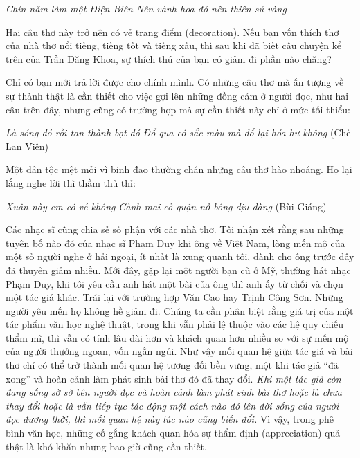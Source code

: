 \documentclass[../main.tex]{subfiles}
\begin{document}
\begin{multicols}{2}
\begin{blockquote}
\textit{Chín năm làm một Điện Biên} 
\textit{Nên vành hoa đỏ nên thiên sử vàng} 

\end{blockquote}


Hai câu thơ này trở nên có vẻ trang điểm (decoration). Nếu bạn vốn thích thơ của nhà thơ nổi tiếng, tiếng tốt và tiếng xấu, thì sau khi đã biết câu chuyện kể trên của Trần Đăng Khoa, sự thích thú của bạn có giảm đi phần nào chăng? 

Chỉ có bạn mới trả lời được cho chính mình. Có những câu thơ mà ấn tượng về sự thành thật là cần thiết cho việc gợi lên những đồng cảm ở người đọc, như hai câu trên đây, nhưng cũng có trường hợp mà sự cần thiết này chỉ ở mức tối thiểu: 
\begin{blockquote}


\textit{Là sóng đó rồi tan thành bọt đó} 
\textit{Đổ qua có sắc màu mà đổ lại hóa hư không} 
(Chế Lan Viên) 

\end{blockquote}


Một dân tộc mệt mỏi vì binh đao thường chán những câu thơ hào nhoáng. Họ lại lắng nghe lời thì thầm thủ thỉ: 
\begin{blockquote}


\textit{Xuân này em có về không} 
\textit{Cành mai cố quận nở bông dịu dàng} 
(Bùi Giáng) 

\end{blockquote}


Các nhạc sĩ cũng chia sẻ số phận với các nhà thơ. Tôi nhận xét rằng sau những tuyên bố nào đó của nhạc sĩ Phạm Duy khi ông về Việt Nam, lòng mến mộ của một số người nghe ở hải ngoại, ít nhất là xung quanh tôi, dành cho ông trước đây đã thuyên giảm nhiều. Mới đây, gặp lại một người bạn cũ ở Mỹ, thường hát nhạc Phạm Duy, khi tôi yêu cầu anh hát một bài của ông thì anh ấy từ chối và chọn một tác giả khác. Trái lại với trường hợp Văn Cao hay Trịnh Công Sơn. Những người yêu mến họ không hề giảm đi. Chúng ta cần phân biệt rằng giá trị của một tác phẩm văn học nghệ thuật, trong khi vẫn phải lệ thuộc vào các hệ quy chiếu thẩm mĩ, thì vẫn có tính lâu dài hơn và khách quan hơn nhiều so với sự mến mộ của người thưởng ngoạn, vốn ngắn ngủi. Như vậy mối quan hệ giữa tác giả và bài thơ chỉ có thể trở thành mối quan hệ tương đối bền vững, một khi tác giả “đã xong” và hoàn cảnh làm phát sinh bài thơ đó đã thay đổi. \textit{Khi một tác giả còn đang sống sờ sờ bên người đọc và hoàn cảnh làm phát sinh bài thơ hoặc là chưa thay đổi hoặc là vẫn tiếp tục tác động một cách nào đó lên đời sống của người đọc đương thời, thì mối quan hệ này lúc nào cũng biến đổi.} Vì vậy, trong phê bình văn học, những cố gắng khách quan hóa sự thẩm định (appreciation) quả thật là khó khăn nhưng bao giờ cũng cần thiết. 


\end{multicols}
\end{document}
